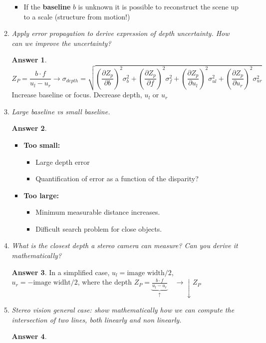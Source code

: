 \documentclass[a4paper,12 pt]{article}
\theoremstyle{definition}
\theoremstyle{remark}
\theoremstyle{definition}
\theoremstyle{definition}
\theoremstyle{definition}
\theoremstyle{definition}
\theoremstyle{remark}
\theoremstyle{remark}
\theoremstyle{definition}
\theoremstyle{definition}
\newtheorem*{answer}{Answer}
\begin{document}
\begin{enumerate}
\begin{enumerate}
\begin{itemize}
\item If the\textbf{ baseline} $b$ is unknown it is possible to reconstruct the scene up to a scale (structure from motion!) 
\end{itemize}
\item \textit{Apply error propagation to derive expression of depth uncertainty. How can we improve the uncertainty?}
\begin{answer}
\begin{equation}
Z_P=\frac{b\cdot f}{u_l-u_r} \rightarrow \sigma_{depth}= \sqrt{(\frac{\partial Z_p}{\partial b})^2 \sigma_b^2+ (\frac{\partial Z_p}{\partial f})^2 \sigma_f^2 + (\frac{\partial Z_p}{\partial u_l})^2 \sigma_{ul}^2 + (\frac{\partial Z_p}{\partial u_r})^2 \sigma_{ur}^2}
\end{equation}
Increase baseline or focus.  Decrease depth, $u_l$ or $u_r$
\end{answer}
\item \textit{Large baseline vs small baseline. }
\begin{answer}
\
\begin{itemize}
\item \textbf{Too small:}
\begin{itemize}
\item Large depth error
\item Quantification of error as a function of the disparity?
\end{itemize}
\item \textbf{Too large:}
\begin{itemize}
\item Minimum measurable distance increases.
\item Difficult search problem for close objects.
\end{itemize}
\end{itemize}
\end{answer}
\item \textit{What is the closest depth a stereo camera can measure? Can you derive it mathematically?}
\begin{answer}
In a simplified case, $u_l = \text{image width}/2$, $u_r=- \text{image widht}/2$,   where the depth $Z_P=\underbrace{\frac{b\cdot f}{u_l-u_r} }_{\uparrow}\quad \rightarrow \downarrow Z_P  $
\end{answer}
\item \textit{Stereo vision general case: show mathematically how we can compute the intersection of two lines, both linearly and non linearly. }
\begin{answer}

\end{answer}
\end{enumerate}
\end{enumerate}
\end{document}
